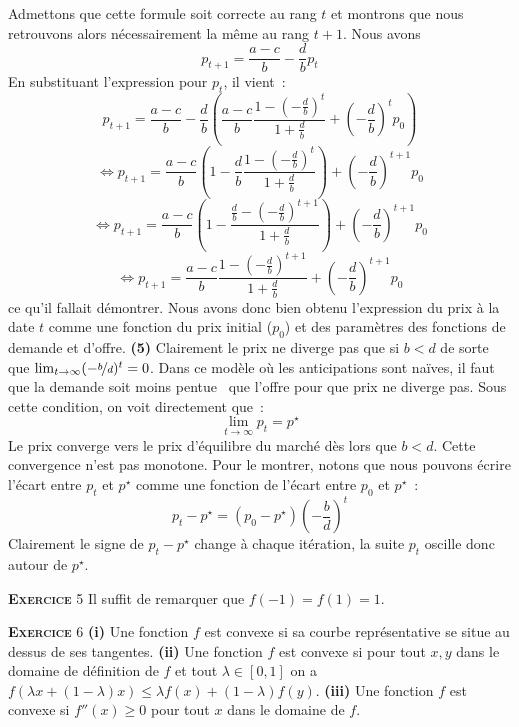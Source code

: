 \documentclass[10pt,a4paper,notitlepage]{article}
\newcommand{\exercice}[1]{\textsc{\textbf{Exercice}} #1}
\begin{document}
Admettons que cette formule soit correcte au rang $t$ et montrons que
nous retrouvons alors nécessairement la même au rang $t+1$. Nous avons
\[
p_{t+1} = \frac{a-c}{b} - \frac{d}{b}p_t
\]
En substituant l'expression pour $p_t$, il vient :
\[
p_{t+1} = \frac{a-c}{b} - \frac{d}{b}\left(\frac{a-c}{b}\frac{1-\left(-\frac{d}{b}\right)^{t}}{1+\frac{d}{b}} + \left(-\frac{d}{b}\right)^{t}p_0\right)
\]
\[
\Leftrightarrow p_{t+1} = \frac{a-c}{b} \left(1 - \frac{d}{b}\frac{1-\left(-\frac{d}{b}\right)^{t}}{1+\frac{d}{b}}\right)+ \left(-\frac{d}{b}\right)^{t+1}p_0
\]
\[
\Leftrightarrow p_{t+1} = \frac{a-c}{b} \left(1 - \frac{\frac{d}{b}-\left(-\frac{d}{b}\right)^{t+1}}{1+\frac{d}{b}}\right)+ \left(-\frac{d}{b}\right)^{t+1}p_0
\]
\[
\Leftrightarrow p_{t+1} = \frac{a-c}{b} \frac{1-\left(-\frac{d}{b}\right)^{t+1}}{1+\frac{d}{b}}+ \left(-\frac{d}{b}\right)^{t+1}p_0
\]
ce qu'il fallait démontrer. Nous avons donc bien obtenu l'expression
du prix à la date $t$ comme une fonction du prix initial ($p_0$) et
des paramètres des fonctions de demande et d'offre. \textbf{(5)}
Clairement le prix ne diverge pas que si $b<d$ de sorte que
$\lim_{t\rightarrow\infty}(-\nicefrac{b}{d})^t=0$. Dans ce modèle où
les anticipations sont naïves, il faut que la demande soit moins \og
pentue \fg\ que l'offre pour que prix ne diverge pas. Sous cette
condition, on voit directement que :
\[
\lim_{t\rightarrow\infty}p_t = p^{\star}
\]
Le prix converge vers le prix d'équilibre du marché dès lors que
$b<d$. Cette convergence n'est pas monotone. Pour le montrer, notons
que nous pouvons écrire l'écart entre $p_t$ et $p^{\star}$ comme une
fonction de l'écart entre $p_0$ et $p^{\star}$ :
\[
p_t - p^{\star} = \left(p_0-p^{\star}\right)\left(-\frac{b}{d}\right)^t
\]
Clairement le signe de $p_t-p^{\star}$ change à chaque itération, la
suite $p_t$ oscille donc autour de $p^{\star}$.

\bigskip

\exercice{5} Il suffit de remarquer que $f(-1)=f(1)=1$.

\bigskip

\exercice{6} \textbf{(i)} Une fonction $f$ est convexe si
sa courbe représentative se situe au dessus de ses
tangentes. \textbf{(ii)} Une fonction $f$ est convexe si
pour tout $x, y$ dans le domaine de définition de $f$ et tout
$\lambda\in[0,1]$ on a $f(\lambda x + (1-\lambda)x) \leq \lambda f(x)
+ (1-\lambda)f(y)$. \textbf{(iii)} Une fonction $f$ est convexe si
$f''(x)\geq 0$ pour tout $x$ dans le domaine de $f$. 

\bigskip
\end{document}

